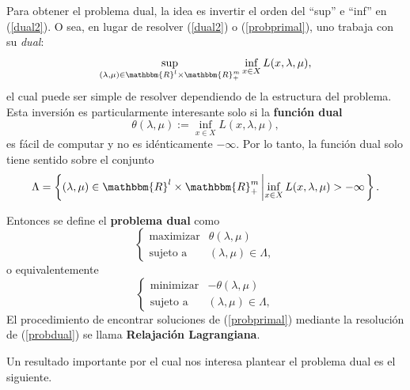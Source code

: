 \documentclass[a4paper,12pt]{report}
\newcommand{\RR}{\mathbbm{R}}
\newcommand{\lam}{\lambda}
\newcommand{\llam}{\Lambda}
\begin{document}
Para obtener el problema dual, la idea es invertir el orden del ``sup'' e ``inf'' en (\ref{dual2}). O sea, en lugar de resolver (\ref{dual2}) o (\ref{probprimal}), uno trabaja con su \textit{dual}:
\begin{equation}\label{dual4}
\sup_{(\lam,\mu)\in\RR^l\times\RR^m_+}\inf_{x\in X}L(x,\lam,\mu),
\end{equation}
el cual puede ser simple de resolver dependiendo de la estructura del problema. Esta inversi\'on es particularmente interesante solo si la \textbf{funci\'on dual}
\begin{equation}\label{dual3}
\theta(\lam,\mu):=\inf_{x\in X}L(x,\lam,\mu),
\end{equation}
es f\'acil de computar y no es id\'enticamente $-\infty$. Por lo tanto, la funci\'on dual solo tiene sentido sobre el conjunto 
$$\llam=\left\{(\lam,\mu)\in\RR^l\times\RR^m_+\left|\inf_{x\in X}L(x,\lam,\mu)>-\infty\right.\right\}.$$


Entonces se define el \textbf{problema dual} como
\begin{equation}
\left\{
 \begin{array}{rl}
  \mathop{\mathrm{maximizar}}& \theta(\lam,\mu)\\
  \mbox{sujeto a}& (\lam,\mu)\in\llam,
 \end{array}
\right.
\end{equation}
o equivalentemente
\begin{equation}\label{probdual}
\left\{
 \begin{array}{rl}
  \mathop{\mathrm{minimizar}}& -\theta(\lam,\mu)\\
  \mbox{sujeto a}& (\lam,\mu)\in\llam,
 \end{array}
\right.
\end{equation}
El procedimiento de encontrar soluciones de (\ref{probprimal}) mediante la resoluci\'on de (\ref{probdual}) se llama \textbf{Relajaci\'on Lagrangiana}.

Un resultado importante por el cual nos interesa plantear el problema dual es el siguiente.
\end{document}
